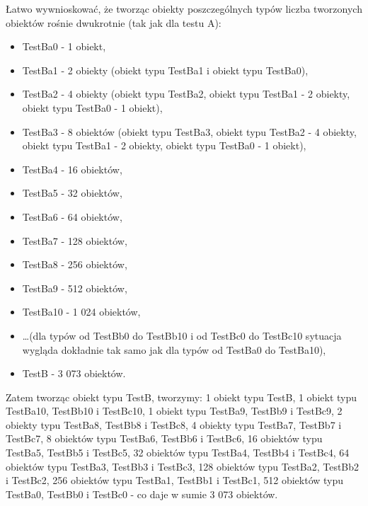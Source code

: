 \documentclass[12pt]{article}
\begin{document}
Łatwo wywnioskować, że tworząc obiekty poszczególnych typów liczba tworzonych obiektów rośnie dwukrotnie (tak jak dla testu A):
\begin{itemize}
	\item TestBa0 - 1 obiekt,
	\item TestBa1 - 2 obiekty (obiekt typu TestBa1 i obiekt typu TestBa0),
	\item TestBa2 - 4 obiekty (obiekt typu TestBa2, obiekt typu TestBa1 - 2 obiekty, obiekt typu TestBa0 - 1 obiekt),
	\item TestBa3 - 8 obiektów (obiekt typu TestBa3, obiekt typu TestBa2 - 4 obiekty, obiekt typu TestBa1 - 2 obiekty, obiekt typu TestBa0 - 1 obiekt),
	\item TestBa4 - 16 obiektów,
	\item TestBa5 - 32 obiektów,
	\item TestBa6 - 64 obiektów,
	\item TestBa7 - 128 obiektów,
	\item TestBa8 - 256 obiektów,
	\item TestBa9 - 512 obiektów,
	\item TestBa10 - 1 024 obiektów,
	\item \ldots (dla typów od TestBb0 do TestBb10 i od TestBc0 do TestBc10 sytuacja wygląda dokładnie tak samo jak dla typów od TestBa0 do TestBa10),
	\item TestB - 3 073 obiektów.
\end{itemize}
Zatem tworząc obiekt typu TestB, tworzymy: 1 obiekt typu TestB, 1 obiekt typu TestBa10, TestBb10 i TestBc10, 1 obiekt typu TestBa9, TestBb9 i TestBc9, 2 obiekty typu TestBa8, TestBb8 i TestBc8, 4 obiekty typu TestBa7, TestBb7 i TestBc7, 8 obiektów typu TestBa6, TestBb6 i TestBc6, 16 obiektów typu TestBa5, TestBb5 i TestBc5, 32 obiektów typu TestBa4, TestBb4 i TestBc4, 64 obiektów typu TestBa3, TestBb3 i TestBc3, 128 obiektów typu TestBa2, TestBb2 i TestBc2, 256 obiektów typu TestBa1, TestBb1 i TestBc1, 512 obiektów typu TestBa0, TestBb0 i TestBc0 - co daje w sumie 3 073 obiektów.
\end{document}
